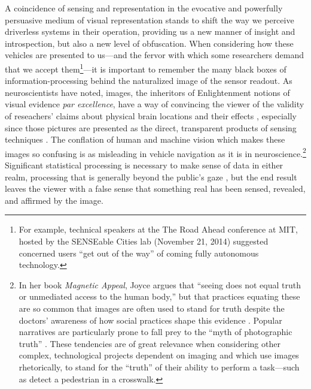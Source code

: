 
A coincidence of sensing and representation in the evocative and
powerfully persuasive medium of visual representation stands to shift
the way we perceive driverless systems in their operation, providing
us a new manner of insight and introspection, but also
a new level of obfuscation. When
considering how these vehicles are presented to us---and the fervor with
which some researchers demand that we accept them\footnote{For
  example, technical speakers at the The Road Ahead conference at MIT,
hosted by the SENSEable Cities lab (November 21, 2014) suggested
concerned users ``get out of the way'' of coming fully autonomous
technology.}---it is important to 
remember the many black boxes of information-processing behind the
naturalized image of the sensor readout. As neuroscientists have
noted, images, the inheritors of Enlightenment notions of
visual evidence \emph{par excellence}, have a way of convincing the viewer of
the validity of reseachers' claims about physical brain locations and
their effects \cite{lehrerNeuro}, especially since those pictures are presented as the
direct, transparent products of sensing techniques \cite[p.
  76]{kellyMagnetic}. The conflation of 
human and machine vision which makes these images so confusing is as
misleading in vehicle navigation as it is in neuroscience.\footnote{In
her book \emph{Magnetic Appeal}, Joyce argues that ``seeing does not
equal truth or unmediated access to the human body,'' but that
practices equating these are so common that images are often used to
stand for truth despite the doctors' awareness of how social practices
shape this evidence
\cite[p. 76]{kellyMagnetic}. Popular narratives are particularly prone
to fall
prey to the ``myth of photographic truth'' \cite[p.
  75]{kellyMagnetic}. These tendencies are of great relevance
when considering other complex, technological projects dependent on
imaging and which use images rhetorically, to stand for the ``truth''
of their ability to perform a task---such as detect a pedestrian in a
crosswalk.} Significant 
statistical processing is necessary to make sense of data in either
realm, processing that is generally beyond the public's gaze
\cite{koerthFish}, but the 
end result leaves the viewer with a false sense that something real
has been sensed, revealed, and affirmed by the image.



